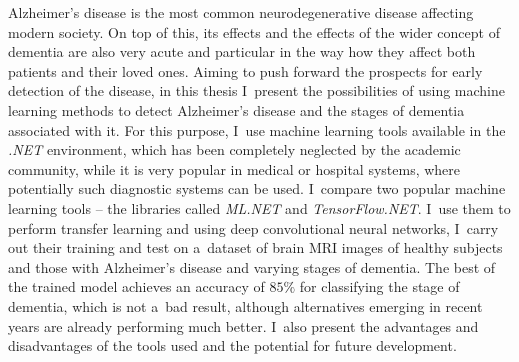 \begin{abstract-en}

  Alzheimer's disease is the most common neurodegenerative disease affecting modern society.
  On top of this, its effects and the effects of the wider concept of dementia are also very acute and particular in the way how they affect both patients and their loved ones.
  Aiming to push forward the prospects for early detection of the disease, in this thesis I~present the possibilities of using machine learning methods to detect Alzheimer's disease and the stages of dementia associated with it.
  For this purpose, I~use machine learning tools available in the \emph{.NET} environment, which has been completely neglected by the academic community, while it is very popular in medical or hospital systems, where potentially such diagnostic systems can be used.
  I~compare two popular machine learning tools -- the libraries called \emph{ML.NET} and \emph{TensorFlow.NET}.
  I~use them to perform transfer learning and using deep convolutional neural networks, I~carry out their training and test on a~dataset of brain MRI images of healthy subjects and those with Alzheimer's disease and varying stages of dementia.
  The best of the trained model achieves an accuracy of $85\%$ for classifying the stage of dementia, which is not a~bad result, although alternatives emerging in recent years are already performing much better.
  I~also present the advantages and disadvantages of the tools used and the potential for future development.

\end{abstract-en}
